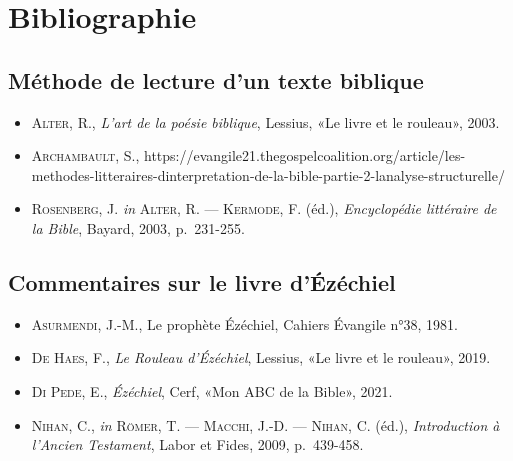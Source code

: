 \section*{Bibliographie}
\subsection*{Méthode de lecture d'un texte biblique}
\begin{itemize}[label=]
    \item \textsc{Alter, R.}, \textit{L'art de la poésie biblique}, Lessius, «Le livre et le rouleau», 2003.
    \item \textsc{Archambault, S.}, https://evangile21.thegospelcoalition.org/article/les-methodes-litteraires-dinterpretation-de-la-bible-partie-2-lanalyse-structurelle/
    \item \textsc{Rosenberg, J.} \textit{in} \textsc{Alter, R. — Kermode, F.} (éd.), \textit{Encyclopédie littéraire de la Bible}, Bayard, 2003, p.~231-255.
\end{itemize}
\subsection*{Commentaires sur le livre d'Ézéchiel}
\begin{itemize}[label=]
    \item \textsc{Asurmendi, J.-M.}, Le prophète Ézéchiel, Cahiers Évangile n°38, 1981.
    \item \textsc{De Haes, F.}, \textit{Le Rouleau d'Ézéchiel}, Lessius, «Le livre et le rouleau», 2019.
    \item \textsc{Di Pede, E.}, \textit{Ézéchiel}, Cerf, «Mon ABC de la Bible», 2021.
    \item \textsc{Nihan, C.}, \textit{in} \textsc{Römer, T. — Macchi, J.-D. — Nihan, C.} (éd.), \textit{Introduction à l'Ancien Testament}, Labor et Fides, 2009, p.~439-458.
\end{itemize}